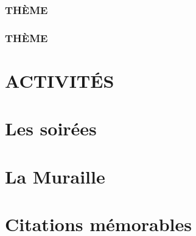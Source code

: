 \documentclass[poly,trombi]{valbonne}
\begin{document}
\subsection{THÈME}


\subsection{THÈME}



\chapter{ACTIVITÉS}


\chapter{\hspace{2mm}Les soirées}

\minitoc \clearpage














\chapter{La Muraille}


\newpage





\chapter{Citations mémorables}

\end{document}
